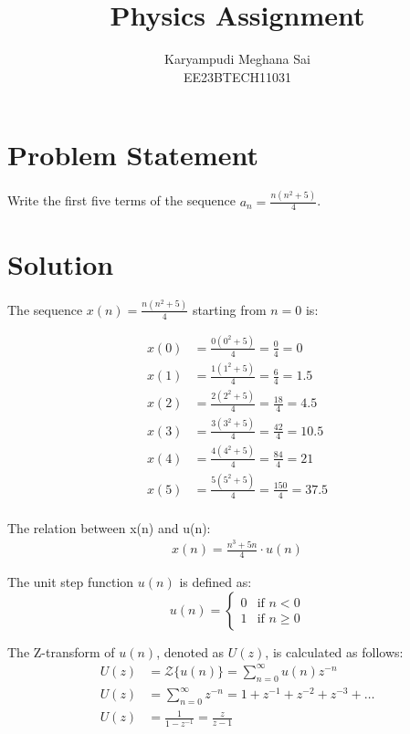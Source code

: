 \documentclass{article}
\begin{document}
\title{Physics Assignment}
\author{Karyampudi Meghana Sai\\ EE23BTECH11031}
\maketitle

\section*{Problem Statement}
Write the first five terms of the sequence \(a_n = \frac{n(n^2+5)}{4}\).

\section*{Solution}
The sequence \(x(n) = \frac{n(n^2+5)}{4}\) starting from \(n = 0\) is:

\begin{align*}
x(0) &= \frac{0(0^2+5)}{4} = \frac{0}{4} = 0 \\
x(1) &= \frac{1(1^2+5)}{4} = \frac{6}{4} = 1.5 \\
x(2) &= \frac{2(2^2+5)}{4} = \frac{18}{4} = 4.5 \\
x(3) &= \frac{3(3^2+5)}{4} = \frac{42}{4} = 10.5 \\
x(4) &= \frac{4(4^2+5)}{4} = \frac{84}{4} = 21 \\
x(5) &= \frac{5(5^2+5)}{4} = \frac{150}{4} = 37.5 \\
\end{align*}


The relation between x(n) and u(n):
\begin{align}
 x(n) = \frac{n^3 + 5n}{4} \cdot u(n) 
 \end{align}

The unit step function \(u(n)\) is defined as:
\[ u(n) = \begin{cases} 0 & \text{if } n < 0 \\ 1 & \text{if } n \geq 0 \end{cases} \]

The Z-transform of \(u(n)\), denoted as \(U(z)\), is calculated as follows:
\begin{align}
U(z) &= \mathcal{Z}\{u(n)\} = \sum_{n=0}^{\infty} u(n)z^{-n} \\
U(z) &= \sum_{n=0}^{\infty} z^{-n} = 1 + z^{-1} + z^{-2} + z^{-3} + \dots \nonumber \\
U(z) &= \frac{1}{1 - z^{-1}} = \frac{z}{z - 1} 
\end{align}
\end{document}
